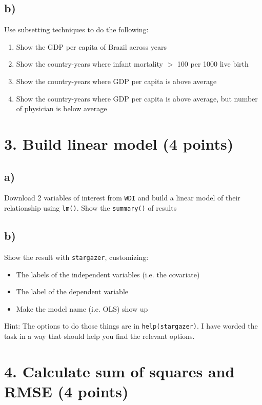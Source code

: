 \documentclass{article}\usepackage[]{graphicx}\usepackage[]{color}
\begin{document}
\subsection*{b)}

Use subsetting techniques to do the following:

\begin{enumerate}
\item Show the GDP per capita of Brazil across years
\item Show the country-years where infant mortality $>$ 100 per 1000 live birth
\item Show the country-years where GDP per capita is above average
\item Show the country-years where GDP per capita is above average, but number of physician is below average
\end{enumerate}

\section*{3. Build linear model (4 points)}

\subsection*{a)}

Download 2 variables of interest from \verb`WDI` and build a linear model of their relationship using \verb`lm()`. Show the \verb`summary()` of results

\subsection*{b)}

Show the result with \verb`stargazer`, customizing:
\begin{itemize}
\item The labels of the independent variables (i.e. the covariate)
\item The label of the dependent variable
\item Make the model name (i.e. OLS) show up
\end{itemize}

Hint: The options to do those things are in \verb`help(stargazer)`. I have worded the task in a way that should help you find the relevant options.

\section*{4. Calculate sum of squares and RMSE (4 points)}
\end{document}
